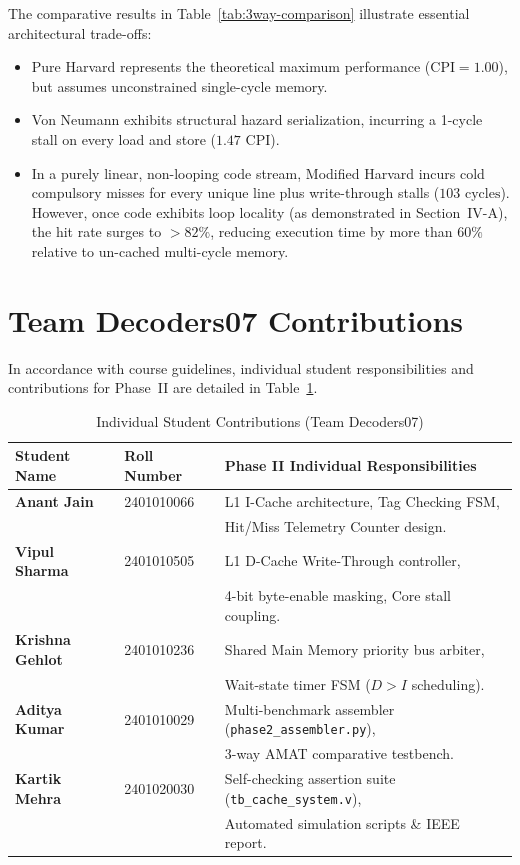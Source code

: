 \documentclass[conference]{IEEEtran}
\begin{document}
The comparative results in Table~\ref{tab:3way-comparison} illustrate essential architectural trade-offs:
\begin{itemize}
    \item Pure Harvard represents the theoretical maximum performance ($\text{CPI} = 1.00$), but assumes unconstrained single-cycle memory.
    \item Von Neumann exhibits structural hazard serialization, incurring a 1-cycle stall on every load and store ($1.47\text{ CPI}$).
    \item In a purely linear, non-looping code stream, Modified Harvard incurs cold compulsory misses for every unique line plus write-through stalls ($103\text{ cycles}$). However, once code exhibits loop locality (as demonstrated in Section~IV-A), the hit rate surges to $>82\%$, reducing execution time by more than $60\%$ relative to un-cached multi-cycle memory.
\end{itemize}

\section{Team Decoders07 Contributions}
In accordance with course guidelines, individual student responsibilities and contributions for Phase~II are detailed in Table~\ref{tab:contributions}.

\begin{table}[htbp]
\caption{Individual Student Contributions (Team Decoders07)}
\label{tab:contributions}
\centering
\begin{tabular}{lll}
\toprule
\textbf{Student Name} & \textbf{Roll Number} & \textbf{Phase II Individual Responsibilities} \\
\midrule
\textbf{Anant Jain} & 2401010066 & L1 I-Cache architecture, Tag Checking FSM, \\
 & & Hit/Miss Telemetry Counter design. \\
\midrule
\textbf{Vipul Sharma} & 2401010505 & L1 D-Cache Write-Through controller, \\
 & & 4-bit byte-enable masking, Core stall coupling. \\
\midrule
\textbf{Krishna Gehlot} & 2401010236 & Shared Main Memory priority bus arbiter, \\
 & & Wait-state timer FSM ($D > I$ scheduling). \\
\midrule
\textbf{Aditya Kumar} & 2401010029 & Multi-benchmark assembler (\texttt{phase2\_assembler.py}), \\
 & & 3-way AMAT comparative testbench. \\
\midrule
\textbf{Kartik Mehra} & 2401020030 & Self-checking assertion suite (\texttt{tb\_cache\_system.v}), \\
 & & Automated simulation scripts \& IEEE report. \\
\bottomrule
\end{tabular}
\end{table}
\end{document}
